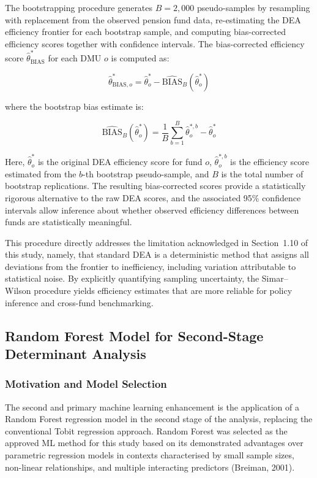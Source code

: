 \documentclass[12pt,a4paper]{article}
\begin{document}
The bootstrapping procedure generates $B = 2{,}000$ pseudo-samples by resampling with replacement from the observed pension fund data, re-estimating the DEA efficiency frontier for each bootstrap sample, and computing bias-corrected efficiency scores together with confidence intervals. The bias-corrected efficiency score $\hat{\theta}^*_{\text{BIAS}}$ for each DMU $o$ is computed as:

\begin{equation}
    \hat{\theta}^*_{\text{BIAS},o} = \hat{\theta}^*_o - \widehat{\text{BIAS}}_B\!\left(\hat{\theta}^*_o\right)
\end{equation}

where the bootstrap bias estimate is:

\begin{equation}
    \widehat{\text{BIAS}}_B\!\left(\hat{\theta}^*_o\right) = \frac{1}{B} \sum_{b=1}^{B} \hat{\theta}^{*,b}_o - \hat{\theta}^*_o
\end{equation}

Here, $\hat{\theta}^*_o$ is the original DEA efficiency score for fund $o$, $\hat{\theta}^{*,b}_o$ is the efficiency score estimated from the $b$-th bootstrap pseudo-sample, and $B$ is the total number of bootstrap replications. The resulting bias-corrected scores provide a statistically rigorous alternative to the raw DEA scores, and the associated 95\% confidence intervals allow inference about whether observed efficiency differences between funds are statistically meaningful.

This procedure directly addresses the limitation acknowledged in Section~1.10 of this study, namely, that standard DEA is a deterministic method that assigns all deviations from the frontier to inefficiency, including variation attributable to statistical noise. By explicitly quantifying sampling uncertainty, the Simar--Wilson procedure yields efficiency estimates that are more reliable for policy inference and cross-fund benchmarking.

\subsection{Random Forest Model for Second-Stage Determinant Analysis}

\subsubsection{Motivation and Model Selection}

The second and primary machine learning enhancement is the application of a Random Forest regression model in the second stage of the analysis, replacing the conventional Tobit regression approach. Random Forest was selected as the approved ML method for this study based on its demonstrated advantages over parametric regression models in contexts characterised by small sample sizes, non-linear relationships, and multiple interacting predictors (Breiman, 2001).
\end{document}
